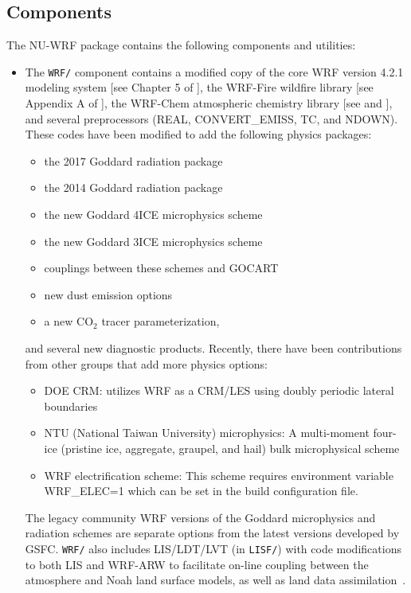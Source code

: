 \subsection{Components}
\label{subsec:Components}

The NU-WRF package contains the following components and utilities:

\begin{itemize}
\item The \texttt{WRF/} component contains a modified copy of the core WRF 
  version 4.2.1 modeling system [see Chapter 5 of \cite{ref:ArwUserGuide}], 
  the WRF-Fire wildfire library [see Appendix A of \cite{ref:ArwUserGuide}], 
  the WRF-Chem atmospheric chemistry library [see \cite{ref:WrfChemUserGuide}
  and \cite{ref:WrfChemEmissionsGuide}], and several preprocessors (REAL, 
  CONVERT\_EMISS, TC, and NDOWN). These codes have been modified to add
  the following physics packages:
  \begin{itemize}
  \item the 2017 Goddard radiation package
  \item the 2014 Goddard radiation package~\citep{ref:GRADUserGuide}
  \item the new Goddard 4ICE microphysics scheme~\citep{ref:LangEtAl2014}
  \item the new Goddard 3ICE  microphysics scheme~\citep{ref:ShiEtAl2014}
  \item couplings between these schemes and GOCART
  \item new dust emission options
  \item a new CO$_2$ tracer parameterization,
  \end{itemize}
  and several new diagnostic products. Recently, there have been contributions
  from other groups that add more physics options:
  \begin{itemize}
  \item DOE CRM: utilizes WRF as a CRM/LES using doubly periodic lateral boundaries
  \item NTU (National Taiwan University) microphysics: A multi-moment four-ice (pristine ice, aggregate, graupel, and hail) bulk microphysical scheme
  \item WRF electrification scheme: This scheme requires environment variable WRF\_ELEC=1 which can be set in the build configuration file.
  \end{itemize}
  The legacy community WRF versions of  the Goddard microphysics and radiation 
  schemes are separate options from the
  latest versions developed by GSFC. \texttt{WRF/} also includes LIS/LDT/LVT
  (in \texttt{LISF/}) with code modifications to both LIS and WRF-ARW to 
  facilitate on-line coupling between the atmosphere and Noah land surface
  models, as well as land data assimilation~\citep{ref:LisUserGuide}.  


\end{itemize}

